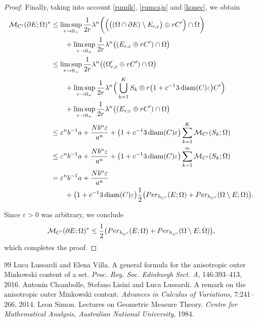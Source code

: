 \documentclass[10pt,a4paper]{amsart}
\DeclareMathOperator{\diam}{\textup{diam}}
\begin{document}
\begin{proof}
Finally, taking into account \eqref{rumík}, \eqref{rumcajs} and \eqref{konec}, we obtain
\[
\begin{split}
\mathcal{M}_{C^{\prime}}(\partial E; \Omega)^* &\leq \limsup_{r\to0_+}\frac{1}{2r}\lambda^n\bigg(\Big(\big((\Omega\cap \partial E)\setminus E_{r, \varepsilon}\big)\oplus rC^{\prime}\Big)\cap\Omega\bigg)\\&\quad\quad+\limsup_{r\to0_+}\frac{1}{2r}\lambda^n\big((E_{r, \varepsilon}\oplus rC^{\prime})\cap\Omega\big)\\
&\leq\limsup_{r\to0_+}\frac{1}{2r}\lambda^n\big((\Omega^{\prime}_{r, \varepsilon}\oplus rC^{\prime})\cap\Omega\big)\\&\quad\quad+\limsup_{r\to0_+}\frac{1}{2r}\lambda^n\Big(\bigcup_{k=1}^K S_k\oplus r\big(1+c^{-1}3\diam(C)\varepsilon\big)C^{\prime}\Big)\\&\quad\quad+\limsup_{r\to0_+}\frac{1}{2r}\lambda^n\big((E_{r, \varepsilon}\oplus rC^{\prime})\cap\Omega\big)\\&\leq \varepsilon^n b^{-1}a+\frac{Nb^n\varepsilon }{a^n} + \big(1+c^{-1}3\diam(C)\varepsilon\big)\sum_{k=1}^K\mathcal{M}_{C^{\prime}}(S_k; \Omega)\\&\leq \varepsilon^n b^{-1}a+\frac{Nb^n\varepsilon }{a^n} + \big(1+c^{-1}3\diam(C)\varepsilon\big)\sum_{k=1}^{\infty}\mathcal{M}_{C^{\prime}}(S_k; \Omega)\\
&= \varepsilon^n b^{-1}a+\frac{Nb^n\varepsilon }{a^n}\\&\quad\quad+ \big(1+c^{-1}3\diam(C)\varepsilon\big)\frac{1}{2}\big(\textup{Per}_{h_{C^{\prime}}}(E; \Omega)+\textup{Per}_{h_{C^{\prime}}}(\Omega\setminus E; \Omega)\big).
\end{split}
\]

Since $\varepsilon>0$ was arbitrary, we conclude
\[
\mathcal{M}_{C^{\prime}}(\partial E; \Omega)^* \leq \frac{1}{2}\big(\textup{Per}_{h_{C^{\prime}}}(E; \Omega)+\textup{Per}_{h_{C^{\prime}}}(\Omega\setminus E; \Omega)\big),
\]
which completes the proof.
\end{proof}

\begin{thebibliography}{99}
 Luca Lussardi and Elena Villa. A general formula for the anisotropic outer {M}inkowski content of a set. \textit{Proc. Roy. Soc. Edinburgh Sect. A}, 146:393--413, 2016.
 Antonin Chambolle, Stefano Lisini and Luca Lussardi. A remark on the anisotropic outer {M}inkowski content. \textit{Advances in Calculus of Variations}, 7:241--266, 2014.
 Leon Simon. Lectures on Geometric Measure Theory. \textit{Centre for Mathematical Analysis, Australian National University}, 1984.
\end{thebibliography}
\end{document}
